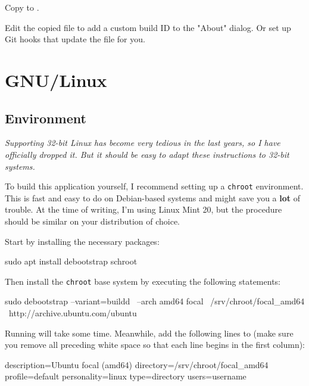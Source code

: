 Copy  to .

Edit the copied file to add a custom build ID to the "About" dialog.
Or set up Git hooks that update the file for you.

\newpage %

\section{GNU/Linux}

\subsection{Environment}

\emph{Supporting 32-bit Linux has become very tedious in the last
  years, so I have officially dropped it.  But it should be easy to
  adapt these instructions to 32-bit systems.}

To build this application yourself, I recommend setting up a
\texttt{chroot} environment.  This is fast and easy to do on
Debian-based systems and might save you a \textbf{lot} of trouble.  At
the time of writing, I'm using Linux Mint 20, but the procedure should
be similar on your distribution of choice.

Start by installing the necessary packages:

\begin{VerbatimBoth}
  sudo apt install debootstrap schroot
\end{VerbatimBoth}

Then install the \texttt{chroot} base system by executing the
following statements:

\begin{Verbatim64}
  sudo debootstrap --variant=buildd \
    --arch amd64 focal \
    /srv/chroot/focal_amd64 \
    http://archive.ubuntu.com/ubuntu
\end{Verbatim64}

Running  will take some time.  Meanwhile, add the
following lines to  (make sure you
remove all preceding white space so that each line begins in the first
column):

\begin{Verbatim64}
  description=Ubuntu focal (amd64)
  directory=/srv/chroot/focal_amd64
  profile=default
  personality=linux
  type=directory
  users=username
\end{Verbatim64}

